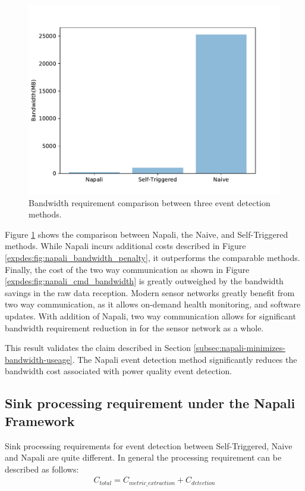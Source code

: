 \begin{figure}[ht!]
    \centering
    \includegraphics[width=0.8\linewidth]{img/napali_eval/napali_bandwidth_comparison.pdf}
    \caption{Bandwidth requirement comparison between three event detection methods.}
    \label{expdes:fig:bandwidth_master_comparison}
\end{figure}

Figure \ref{expdes:fig:bandwidth_master_comparison} shows the comparison between Napali, the Naive, and Self-Triggered methods.
While Napali incurs additional costs described in Figure \ref{expdes:fig:napali_bandwidth_penalty}, it outperforms the comparable methods.
Finally, the cost of the two way communication as shown in Figure \ref{expdes:fig:napali_cmd_bandwidth} is greatly outweighed by the bandwidth savings in the raw data reception.
Modern sensor networks greatly benefit from two way communication, as it allows on-demand health monitoring, and software updates.
With addition of Napali, two way communication allows for significant bandwidth requirement reduction in for the sensor network as a whole.

This result validates the claim described in Section \ref{subsec:napali-minimizes-bandwidth-useage}.
The Napali event detection method significantly reduces the bandwidth cost associated with power quality event detection.

\subsection{Sink processing requirement under the Napali Framework}\label{subsec:sink-processing-requirement-under-the-napali-framework}
Sink processing requirements for event detection between Self-Triggered, Naive and Napali are quite different.
In general the processing requirement can be described as follows:
\begin{equation}\label{eq:detection_cost}
\begin{aligned}
    C_{total} = C_{metric\_extraction} + C_{detection}
\end{aligned}
\end{equation}

